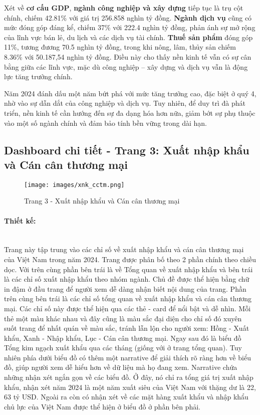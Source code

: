 \documentclass[a4paper]{report}
\begin{document}
{{Xét về \textbf{cơ cấu GDP}, \textbf{ngành công nghiệp và xây dựng} tiếp tục là trụ cột chính, chiếm 42.81\% với giá trị 256.858 nghìn tỷ đồng. \textbf{Ngành dịch vụ} cũng có mức đóng góp đáng kể, chiếm 37\% với 222.4 nghìn tỷ đồng, phản ánh sự mở rộng của lĩnh vực bán lẻ, du lịch và các dịch vụ tài chính. \textbf{Thuế sản phẩm} đóng góp 11\%, tương đương 70.5 nghìn tỷ đồng, trong khi nông, lâm, thủy sản chiếm 8.36\% với 50.187,54 nghìn tỷ đồng. Điều này cho thấy nền kinh tế vẫn có sự cân bằng giữa các lĩnh vực, mặc dù công nghiệp – xây dựng và dịch vụ vẫn là động lực tăng trưởng chính.  

Năm 2024 đánh dấu một năm bứt phá với mức tăng trưởng cao, đặc biệt ở quý 4, nhờ vào sự dẫn dắt của công nghiệp và dịch vụ. Tuy nhiên, để duy trì đà phát triển, nền kinh tế cần hướng đến sự đa dạng hóa hơn nữa, giảm bớt sự phụ thuộc vào một số ngành chính và đảm bảo tính bền vững trong dài hạn.
\newpage
\subsection{Dashboard chi tiết - Trang 3: Xuất nhập khẩu và Cán cân thương mại}


\begin{figure}[H]
    \centering
    \texttt{[image: images/xnk\_cctm.png]}
    \caption{Trang 3 - Xuất nhập khẩu và Cán cân thương mại}
    \label{fig:enter-label}
\end{figure}


\paragraph{Thiết kế: } \mbox{}\\
Trang này tập trung vào các chỉ số về xuất nhập khẩu và cán cân thương mại của Việt Nam trong năm 2024. Trang được phân bố theo 2 phần chính theo chiều dọc.
Với trên cùng phần bên trái là về Tổng quan về xuất nhập khẩu và bên trái là các chỉ số xuất nhập khẩu theo nhóm ngành. Chủ đề được thể hiện bằng chữ in đậm ở đầu trang để người xem dễ dàng nhận biết nội dung của trang.
Phần trên cùng bên trái là các chỉ số tổng quan về xuất nhập khẩu và cán cân thương mại. Các chỉ số này được thể hiện qua các thẻ - card để nổi bật và dễ nhìn. Mỗi thẻ một màu khác nhau và đây cũng là màu sắc đại diện cho chỉ số đó xuyên suốt trang để nhất quán về màu sắc, tránh lẫn lộn cho người xem: Hồng - Xuất khẩu, Xanh - Nhập khẩu, Lục - Cán cân thương mại.
Ngay sau đó là biểu đồ Tổng kim ngạch xuất khẩu qua các tháng (giống với ở trang tổng quan). Tuy nhiên phía dưới biểu đồ có thêm một narrative để giải thích rõ ràng hơn về biểu đồ, giúp người xem dễ hiểu hơn về dữ liệu mà họ đang xem.
Narrative chứa những nhận xét ngắn gọn về các biểu đồ. Ở đây, nó chỉ ra tổng giá trị xuất nhập khẩu, nhận xét năm 2024 là một năm xuất siêu của Việt Nam với thặng dư là 22, 63 tỷ USD. Ngoài ra còn có nhận xét về các mặt hàng xuất khẩu và nhập khẩu chủ lực của Việt Nam được thể hiện ở biểu đồ ở phần bên phải.\\

}}
\end{document}
